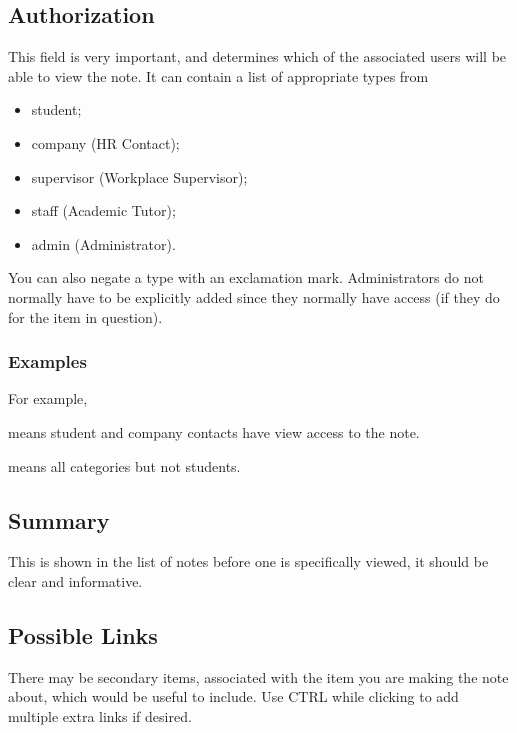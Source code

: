 \documentclass[12 pt]{book}
\begin{document}
\subsection{Authorization}

This field is very important, and determines which of the associated users will
be able to view the note. It can contain a list of appropriate types from

\begin{itemize}
\item student;
\item company (HR Contact);
\item supervisor (Workplace Supervisor);
\item staff (Academic Tutor);
\item admin (Administrator).
\end{itemize}

You can also negate a type with an exclamation mark. Administrators do not
normally have to be explicitly added since they normally have access (if they
do for the item in question).

\subsubsection{Examples}

For example,


means student and company contacts have view access to the note.


means all categories but not students.


\subsection{Summary}

This is shown in the list of notes before one is specifically viewed, it should
be clear and informative.

\subsection{Possible Links}

There may be secondary items, associated with the item you are making the note
about, which would be useful to include. Use CTRL while clicking to add
multiple extra links if desired.
\end{document}
